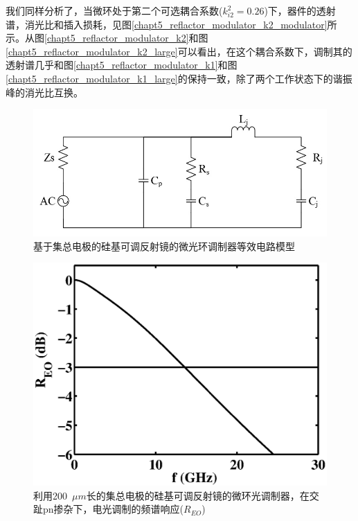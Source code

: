 我们同样分析了，当微环处于第二个可选耦合系数($k_{i2}^2 = 0.26$)下，器件的透射谱，消光比和插入损耗，见图\ref{chapt5_reflactor_modulator_k2_modulator}所示。从图\ref{chapt5_reflactor_modulator_k2}和图\ref{chapt5_reflactor_modulator_k2_large}可以看出，在这个耦合系数下，调制其的透射谱几乎和图\ref{chapt5_reflactor_modulator_k1}和图\ref{chapt5_reflactor_modulator_k1_large}的保持一致，除了两个工作状态下的谐振峰的消光比互换。

\begin{figure}[htb]
	\centering
	\includegraphics[width=12cm]{./Pictures/chapt5_tunable_reflection_ring_modulator_equit_circuit.jpg}
	\caption{基于集总电极的硅基可调反射镜的微光环调制器等效电路模型}
	\label{chapt5_tunable_reflection_ring_modulator_equit_circuit}
\end{figure}
\begin{figure}[htb]
	\centering
	\includegraphics[width=12cm]{./Pictures/chapt5_bandwidth.eps}
	\caption{利用200~$\mu m$长的集总电极的硅基可调反射镜的微环光调制器，在交趾pn掺杂下，电光调制的频谱响应($R_{EO}$)}
	\label{chapt5_bandwidth}
\end{figure}


